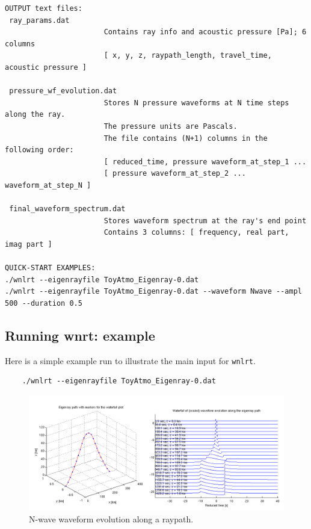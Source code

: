 \begin{verbatim}
OUTPUT text files:
 ray_params.dat
                       Contains ray info and acoustic pressure [Pa]; 6 columns 
                       [ x, y, z, raypath_length, travel_time, acoustic pressure ]

 pressure_wf_evolution.dat
                       Stores N pressure waveforms at N time steps along the ray.
                       The pressure units are Pascals.
                       The file contains (N+1) columns in the following order: 
                       [ reduced_time, pressure waveform_at_step_1 ...
                       [ pressure waveform_at_step_2 ... waveform_at_step_N ]

 final_waveform_spectrum.dat
                       Stores waveform spectrum at the ray's end point 
                       Contains 3 columns: [ frequency, real part, imag part ]

QUICK-START EXAMPLES:
./wnlrt --eigenrayfile ToyAtmo_Eigenray-0.dat
./wnlrt --eigenrayfile ToyAtmo_Eigenray-0.dat --waveform Nwave --ampl 500 --duration 0.5
\end{verbatim}

\subsection{Running wnrt: example}

Here is a simple example run to illustrate the main input for \verb+wnlrt+.
\begin{verbatim} 
    ./wnlrt --eigenrayfile ToyAtmo_Eigenray-0.dat
\end{verbatim}

\begin{figure}[h]
\begin{center}
\includegraphics[scale=0.45,trim = 40 10 10 20,clip]{figs/fig_wnrt_example.png}
\end{center}
\caption{N-wave waveform evolution along a raypath.}
\label{fig:wnlrt_fig1}
\end{figure}

